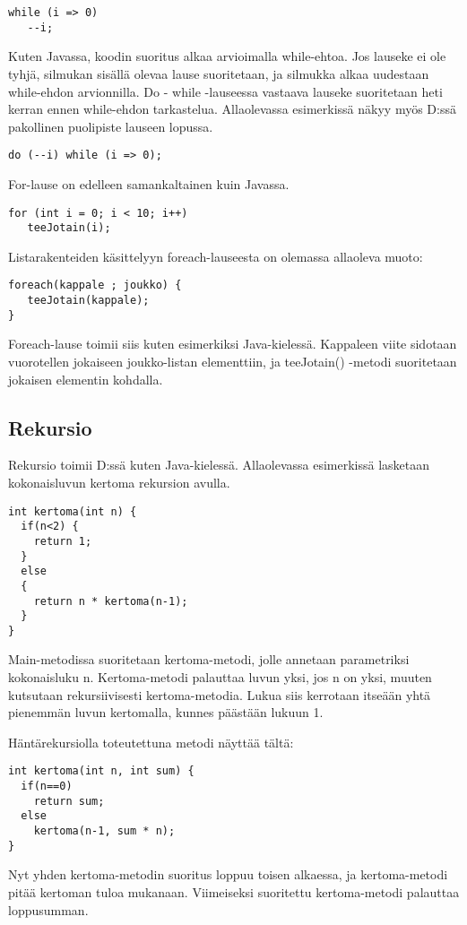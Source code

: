 \documentclass[11pt,oneside,a4paper]{article}
\begin{document}
\begin{verbatim}
while (i => 0)
   --i;
\end{verbatim}
Kuten Javassa, koodin suoritus alkaa arvioimalla while-ehtoa. Jos lauseke ei ole
tyhjä, silmukan sisällä olevaa lause suoritetaan, ja silmukka alkaa uudestaan
while-ehdon arvionnilla. Do - while -lauseessa vastaava lauseke suoritetaan heti
kerran ennen while-ehdon tarkastelua. Allaolevassa esimerkissä näkyy myös D:ssä
pakollinen puolipiste lauseen lopussa.

\begin{verbatim}
do (--i) while (i => 0);
\end{verbatim}
For-lause on edelleen samankaltainen kuin Javassa.

\begin{verbatim}
for (int i = 0; i < 10; i++) 
   teeJotain(i);
\end{verbatim}
Listarakenteiden käsittelyyn foreach-lauseesta on olemassa allaoleva muoto:

\begin{verbatim}
foreach(kappale ; joukko) {
   teeJotain(kappale);
}
\end{verbatim}
Foreach-lause toimii siis kuten esimerkiksi Java-kielessä. Kappaleen viite
sidotaan vuorotellen jokaiseen joukko-listan elementtiin, ja teeJotain() -metodi
suoritetaan jokaisen elementin kohdalla. 

\subsection{Rekursio}

Rekursio toimii D:ssä kuten Java-kielessä. Allaolevassa esimerkissä lasketaan
kokonaisluvun kertoma rekursion avulla.

\begin{verbatim}
int kertoma(int n) {
  if(n<2) {
    return 1;
  }
  else
  {
    return n * kertoma(n-1);
  }
}
\end{verbatim}
Main-metodissa suoritetaan kertoma-metodi, jolle annetaan parametriksi
kokonaisluku n. Kertoma-metodi palauttaa luvun yksi, jos n on yksi, muuten
kutsutaan rekursiivisesti kertoma-metodia. Lukua siis kerrotaan itseään yhtä
pienemmän luvun kertomalla, kunnes päästään lukuun 1.  

Häntärekursiolla toteutettuna metodi näyttää tältä:
\begin{verbatim}
int kertoma(int n, int sum) {
  if(n==0) 
    return sum;
  else
    kertoma(n-1, sum * n);
}
\end{verbatim}
Nyt yhden kertoma-metodin suoritus loppuu toisen alkaessa, ja kertoma-metodi
pitää kertoman tuloa mukanaan. Viimeiseksi suoritettu kertoma-metodi palauttaa
loppusumman.
\end{document}
